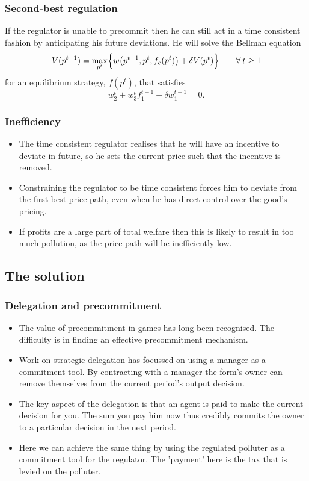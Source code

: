 \documentclass{beamer}
\begin{document}
\begin{frame}
  \frametitle{Second-best regulation}
  If the regulator is unable to precommit then he can still act in a
  time consistent fashion by anticipating his future deviations. He
  will solve the Bellman equation
  \begin{equation} \label{tc:bell} V(p^{t-1}) = \max_{p^t} \Bigl\{ w
    \bigl( p^{t-1},p^t,f_e(p^t) \bigr) + \delta V(p^t) \Bigr\} \qquad
    \forall\: t \geq 1
  \end{equation}
    for an equilibrium strategy, $f(p^t)$, that satisfies
  \begin{equation} \label{tc:mpe} w^t_2 + w^t_3 f^{t+1}_1 + \delta
    w^{t+1}_1 = 0.
\end{equation}
\end{frame}


\begin{frame}
    \frametitle{Inefficiency}
    \begin{itemize}
    \item<1-> The time consistent regulator realises that he will
      have an incentive to deviate in future, so he sets the current
      price such that the incentive is removed.
    \item<2-> Constraining the regulator to be time consistent forces
      him to deviate from the first-best price path, even when he has
      direct control over the good's pricing.
    \item<3-> If profits are a large part of total welfare then this
      is likely to result in too much pollution, as the price path
      will be inefficiently low.
    \end{itemize}
\end{frame}

\subsection{The solution}

\begin{frame}
  \frametitle{Delegation and precommitment}
  \begin{itemize}
  \item<1-> The value of precommitment in games has long been
    recognised. The difficulty is in finding an effective
    precommitment mechanism.
  \item<2-> Work on strategic delegation has focussed on using a
    manager as a commitment tool. By contracting with a manager the
    form's owner can remove themselves from the current period's
    output decision.
  \item<3-> The key aspect of the delegation is that an agent is paid
    to make the current decision for you. The sum you pay him now thus
    credibly commits the owner to a particular decision in the next
    period.
  \item<4-> Here we can achieve the same thing by using the regulated
    polluter as a commitment tool for the regulator. The 'payment'
    here is the tax that is levied on the polluter.
  \end{itemize}
\end{frame}
\end{document}
